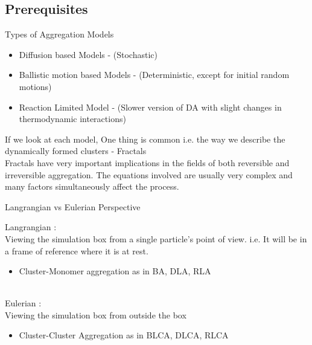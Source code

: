 \documentclass{beamer}
\begin{document}

\subsection{Prerequisites}

\begin{frame}{Types of Aggregation Models}
  \begin{itemize}
  \item {
    Diffusion based Models - (Stochastic)
  }
  \item {
   Ballistic motion based Models  - (Deterministic, except for initial random motions)
  }
  \item{
    Reaction Limited Model - (Slower version of DA with slight changes in thermodynamic interactions)
  }
  \end{itemize}
If we look at each model, One thing is common i.e. the way we describe the dynamically formed clusters - \alert{Fractals} \\
\vspace{10pt}
Fractals have very important implications in the fields of both reversible and irreversible aggregation. The equations involved are usually very complex and many factors simultaneously affect the process.
\end{frame} 

\begin{frame}{Langrangian vs Eulerian Perspective}

    Langrangian : \\ Viewing the simulation box from a single particle's point of view. i.e. It will be in a frame of reference where it is at rest.
    \begin{itemize}
        \item{
        Cluster-Monomer aggregation as in BA, DLA, RLA }
    \end{itemize}\\
    \vspace{20pt}
    Eulerian : \\ Viewing the simulation box from outside the box
    \begin{itemize}
        \item{
        Cluster-Cluster Aggregation as in BLCA, DLCA, RLCA}
    \end{itemize}
\end{frame}
\end{document}
